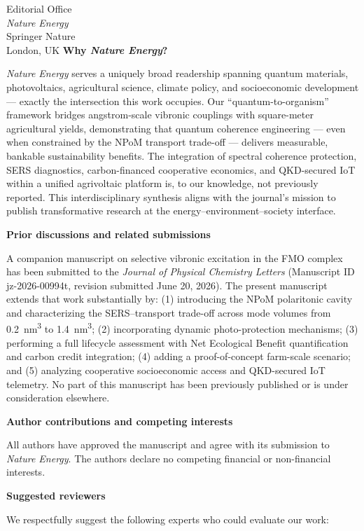 \documentclass[12pt]{letter}
\begin{document}
\begin{letter}{Editorial Office\\
\textit{Nature Energy}\\
Springer Nature\\
London, UK}
\noindent\textbf{Why \textit{Nature Energy}?}

\textit{Nature Energy} serves a uniquely broad readership spanning quantum materials, photovoltaics, agricultural science, climate policy, and socioeconomic development --- exactly the intersection this work occupies. Our ``quantum-to-organism'' framework bridges angstrom-scale vibronic couplings with square-meter agricultural yields, demonstrating that quantum coherence engineering --- even when constrained by the NPoM transport trade-off --- delivers measurable, bankable sustainability benefits. The integration of spectral coherence protection, SERS diagnostics, carbon-financed cooperative economics, and QKD-secured IoT within a unified agrivoltaic platform is, to our knowledge, not previously reported. This interdisciplinary synthesis aligns with the journal's mission to publish transformative research at the energy--environment--society interface.

\noindent\textbf{Prior discussions and related submissions}

A companion manuscript on selective vibronic excitation in the FMO complex has been submitted to the \textit{Journal of Physical Chemistry Letters} (Manuscript ID jz-2026-00994t, revision submitted June 20, 2026). The present manuscript extends that work substantially by: (1) introducing the NPoM polaritonic cavity and characterizing the SERS--transport trade-off across mode volumes from \qty{0.2}{\nm\cubed} to \qty{1.4}{\nm\cubed}; (2) incorporating dynamic photo-protection mechanisms; (3) performing a full lifecycle assessment with Net Ecological Benefit quantification and carbon credit integration; (4) adding a proof-of-concept farm-scale scenario; and (5) analyzing cooperative socioeconomic access and QKD-secured IoT telemetry. No part of this manuscript has been previously published or is under consideration elsewhere.

\noindent\textbf{Author contributions and competing interests}

All authors have approved the manuscript and agree with its submission to \textit{Nature Energy}. The authors declare no competing financial or non-financial interests.

\noindent\textbf{Suggested reviewers}

We respectfully suggest the following experts who could evaluate our work:


\end{letter}
\end{document}
